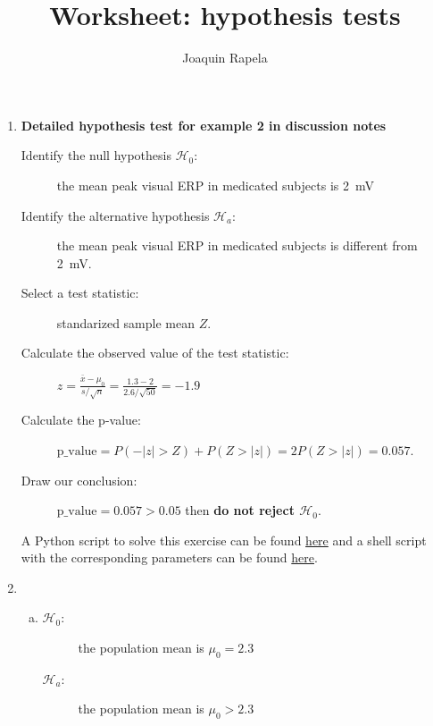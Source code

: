 \documentclass[12pt]{article}
\title{Worksheet: hypothesis tests}
\author{Joaquin Rapela}
\begin{document}
\maketitle

\begin{enumerate}
    \item \textbf{Detailed hypothesis test for example 2 in discussion notes}

        \begin{description}

            \item [Identify the null hypothesis $\mathcal{H}_0$:] the mean peak
                visual ERP in medicated subjects is 2~mV

            \item [Identify the alternative hypothesis $\mathcal{H}_a$:] the
                mean peak visual ERP in medicated subjects is different from
                2~mV.

            \item [Select a test statistic:] standarized sample mean $Z$.

            \item [Calculate the observed value of the test statistic:]
                $z=\frac{\bar{x}-\mu_0}{s/\sqrt{n}}=\frac{1.3-2}{2.6/\sqrt{50}}=-1.9$

            \item [Calculate the p-value:]
                $\text{p\_value}=P(-|z|>Z)+P(Z>|z|)=2 P(Z>|z|)=0.057$.

            \item [Draw our conclusion:] $\text{p\_value}=0.057>0.05$ then
                \textbf{do not reject $\mathcal{H}_0$}.

        \end{description}

        A Python script to solve this exercise can be found
        \href{https://github.com/joacorapela/neuroinformatics24/blob/master/worksheets/01_tTestAndRandomizationTests/mySolution/code/doZTest.py}{here}
        and a shell script with the corresponding parameters can be found
        \href{https://github.com/joacorapela/neuroinformatics24/blob/master/worksheets/01_tTestAndRandomizationTests/mySolution/code/doEx1.csh}{here}.

    \item 
        \begin{enumerate}[(a)]
            \item
                \begin{description}
                    \item[$\mathcal{H}_0$:] the population mean is $\mu_0=2.3$
                    \item[$\mathcal{H}_a$:] the population mean is $\mu_0>2.3$
                \end{description}


\end{enumerate}
\end{enumerate}
\end{document}
